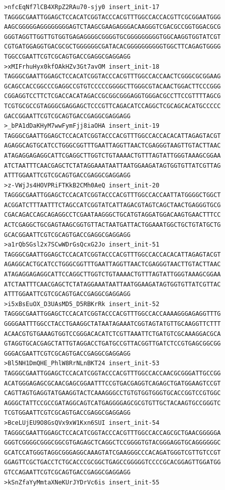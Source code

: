 \documentclass[11pt]{article}
\begin{document}
\begin{verbatim}
>nfcEqNf7lCB4XRpZ2RAu70-sjy0 insert_init-17
TAGGGCGAATTGGAGCTCCACATCGGTACCCACGTTTGGCCACCACGTTCGCGGAATGGG
AAGCGGGGGAGGGGGGGGAGTCTAAGCGAAGAGGGACAAGGGTCGACGCCGGTGGACGCG
GGGTAGGTTGGTTGTGGTGAGAGGGGCGGGGTGCGGGGGGGGGTGGCAAGGTGGTATCGT
CGTGATGGAGGTGACGCGCTGGGGGGCGATACACGGGGGGGGGGTGGCTTCAGAGTGGGG
TGGCCGAATTCGTCGCAGTGACCGAGGCGAGGAGG
>xMIFrhuHyx0kfOAkHZv3Gt7avOM insert_init-18
TAGGGCGAATTGGAGCTCCACATCGGTACCCACGTTTGGCCACCAACTCGGGCGCGGAAG
GCAGCCACCGGCCCGAGGCCGTGTCCCCCGGGGCTTGGGCGTACAACTGGACTTCCCGGG
CGGAGGTCCTTCTCGACCACATAGACCGCGGCGGGAGGTGGGACGCCTTCCGTTTTAGCG
TCGTGCGCCGTAGGGCGAGGAGCTCCCGTTCAGACATCCAGGCTCGCAGCACATGCCCCC
GACCGGAATTCGTCGCAGTGACCGAGGCGAGGAGG
>_bPA1dDaKHyM7wwFymFjj8iaOHA insert_init-19
TAGGGCGAATTGGAGCTCCACATCGGTACCCACGTTTGGCCACCACACATTAGAGTACGT
AGAGGCAGTGCATCCTGGGCGGTTTGAATTAGGTTAACTCGAGGGTAAGTTGTACTTAAC
ATAGAGGAGAGGCATTCGAGGCTTGGTCTGTAAAACTGTTTAGTATTGGGTAAAGCGGAA
ATCTAATTTCAACGAGCTCTATAGGAAATAATTAATGGAAGATAGTGGTGTTATCGTTAG
ATTTGGAATTCGTCGCAGTGACCGAGGCGAGGAGG
>z-VWjJs4HOVPRiFTKkB2CMh0AeQ insert_init-20
TAGGGCGAATTGGAGCTCCACATCGGTACCCACGTTTGGCCACCAATTATGGGGCTGGCT
ACGGATCTTTAATTTCTAGCCATCGGTATCATTAGACGTAGTCAGCTAACTGAGGGTGCG
CGACAGACCAGCAGAGGCCTCGAATAAGGGCTGCATGTAGGATGGACAAGTGAACTTTCC
ACTCGAGGCTGCGAGTAAGCGGTGTTACTAATGATTACTGGAAATGGCTGCTGTATGCTG
GCACGGAATTCGTCGCAGTGACCGAGGCGAGGAGG
>a1rQbSGsl2x7SCwWDrGsQcxG2Jo insert_init-51
TAGGGCGAATTGGAGCTCCACATCGGTACCCACGTTTGGCCACCACACATTAGAGTACGT
AGAGGCACTGCATCCTGGGCGGTTTGAATTAGGTTAACTCGAGGGTAACTTGTACTTAAC
ATAGAGGAGAGGCATTCCAGGCTTGGTCTGTAAAACTGTTTAGTATTGGGTAAAGCGGAA
ATCTAATTTCAACGAGCTCTATAGGAAATAATTAATGGAAGATAGTGGTGTTATCGTTAC
ATTTGGAATTCGTCGCAGTGACCGAGGCGAGGAGG
>i5xBsEuOX_D3UAsMD5_D5RBKrRk insert_init-52
TAGGGCGAATTGGAGCTCCACATCGGTACCCACGTTTGGCCACCAAAAGGGAGAGGTTTG
GGGGAATTTGGCCTACCTGAAGGCTATAATAGAAATCGGTAGTATGTTGCAAGGTTCTTT
ACAACGTGTGAAAGTGGTCCGGGACACATCTCGTTAAATTCTGATGTCGCAAAGGACGCA
GTAGGTGCACGAGCTATTGTAGGACCTGATGCCGTTACGGTTGATCTCCGTGAGCGGCGG
GGGACGAATTCGTCGCAGTGACCGAGGCGAGGAGG
>Bl5NH1DmQHE_PhlW8RrNLnBKT24 insert_init-53
TAGGGCGAATTGGAGCTCCACATCGGTACCCACGTTTGGCCACCAACGCGGGATTGCCGG
ACATGGGAGAGCGCAACGAGCGGAATTTCCGTGACGAGGTCAGAGCTGATGGAAGTCCGT
CAGTTAGTGAGGTATGAAGGTACTCAAAGGGCCTGTGTGGTGGGTGCACCGGTCCGTGGC
AGGGCTATTCCGCCGATAGGCAGTCATGAGGGGAGCGCGTGTTGCTACAAGTGCCGGGTC
TCGTGGAATTCGTCGCAGTGACCGAGGCGAGGAGG
>BceLUjEU9O8GsQVx9xW1Kxn6SUI insert_init-54
TAGGGCGAATTGGAGCTCCACATCGGTACCCACGTTTGGCCACCAGCGCTGAACGGGGGA
GGGTCGGGGCGGGCGGCGTGAGAGCTCAGGCTCCGGGGTGTACGGGAGGTGCAGGGGGGC
GCATCCATGGGTAGGCGGGAGGCAAAGTATCGAAGGGCCCACAGATGGGTCGTTGTCCGT
GGAGTTCGCTGACCTCTGCACCCGCGGCTGAGCCGGGGGTCCCCGCACGGAGTTGGATGG
GTCCAGAATTCGTCGCAGTGACCGAGGCGAGGAGG
>kSnZfaYyMmtaXNeKUrJYDrVc6is insert_init-55

\end{verbatim}
\end{document}
